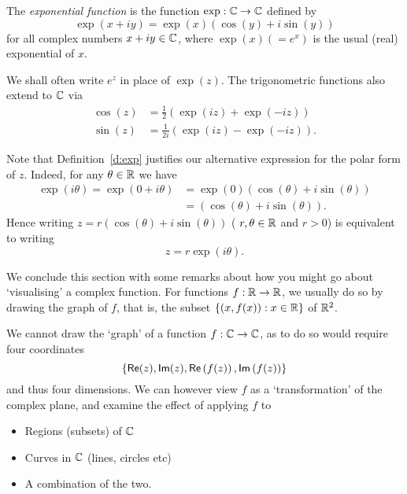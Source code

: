 \begin{definition}
\label{d:exp}
The \emph{exponential function} is the function $\exp : \mathbb{C} \to \mathbb{C}$ defined by
\[
\exp (x+iy) = \exp(x) \left( \cos (y) + i \sin (y) \right)
\]
for all complex numbers $x+iy \in \mathbb{C}$, where $\exp (x) (=e^x)$ is the usual (real) exponential of $x$.
\end{definition}
We shall often write $e^z$ in place of $\exp (z)$.   The trigonometric functions also extend to $\mathbb{C}$ via
\begin{align}
\cos (z) &= \frac{1}{2} \left( \exp (iz) + \exp (-iz) \right) \\
\sin (z) & = \frac{1}{2i} \left( \exp(iz)- \exp (-iz) \right).
\end{align}



Note that Definition~\ref{d:exp} justifies our alternative expression for the polar form of $z$.  Indeed, for any $\theta \in \mathbb{R}$ we have
\begin{align*}
\exp( i \theta ) =  \exp( 0+i \theta ) &= \exp (0) \left( \cos ( \theta) + i \sin (\theta) \right) \\
& = \left( \cos ( \theta) + i \sin (\theta) \right).
\end{align*}
Hence writing $z=r \left( \cos(\theta) + i \sin ( \theta ) \right)$ ( $r,\theta \in \mathbb{R}$ and $r>0$) is equivalent to writing
\[
z = r \exp (i \theta).
\]



We conclude this section with some remarks about how you might go about `visualising' a complex function.  For functions $f:\mathbb{R} \to \mathbb{R}$, we usually do so by drawing the graph of $f$, that is, the subset $\left\{(x,f(x)): x \in \mathbb{R}\right\}$ of $\mathbb{R}^2$.

We cannot draw the `graph' of a function $f:\mathbb{C} \to \mathbb{C}$, as to do so would require four coordinates
\[
\left\{ \textsf{Re} (z), \textsf{Im} (z) , \textsf{Re} \left( f(z) \right), \textsf{Im} \left( f(z) \right) \right\}
\]
and thus four dimensions.  We can however view $f$ as a `transformation' of the complex plane, and examine the effect of applying $f$ to
\begin{itemize}
\item Regions (subsets) of $\mathbb{C}$
\item Curves in $\mathbb{C}$ (lines, circles etc)
\item A combination of the two.
\end{itemize}


